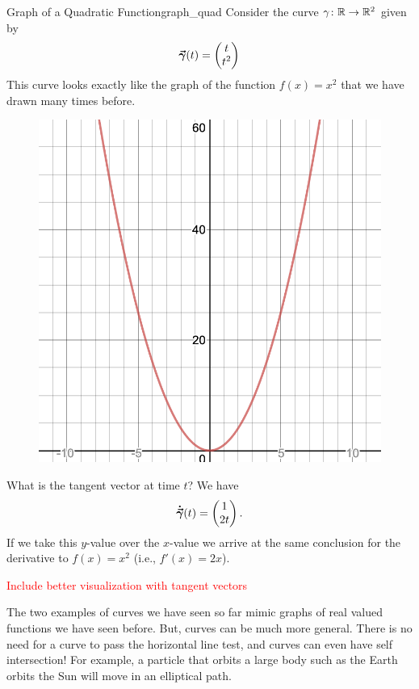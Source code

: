         \begin{ex}{Graph of a Quadratic Function}{graph_quad}
        Consider the curve $\gamma\colon \mathbb{R} \to \mathbb{R}^2$ given by
        \[
        \boldsymbol{\vec{\gamma}}(t)=\begin{pmatrix} t \\ t^2 \end{pmatrix}
        \]
        This curve looks exactly like the graph of the function $f(x)=x^2$ that we have drawn many times before. 
        \begin{figure}[H]
            \centering
            \includegraphics[width=.4\textwidth]{Figures_Part_6/quadratic_curve.png}
        \end{figure}
        What is the tangent vector at time $t$? We have
        \[
        \boldsymbol{\dot{\vec{\gamma}}}(t)=\begin{pmatrix} 1 \\ 2t \end{pmatrix}.
        \]
        If we take this $y$-value over the $x$-value we arrive at the same conclusion for the derivative to $f(x)=x^2$ (i.e., $f'(x)=2x$).

        \textcolor{red}{Include better visualization with tangent vectors}
        \end{ex}
        
        The two examples of curves we have seen so far mimic graphs of real valued functions we have seen before.  But, curves can be much more general.  There is no need for a curve to pass the horizontal line test, and curves can even have self intersection! For example, a particle that orbits a large body such as the Earth orbits the Sun will move in an elliptical path.  
        
